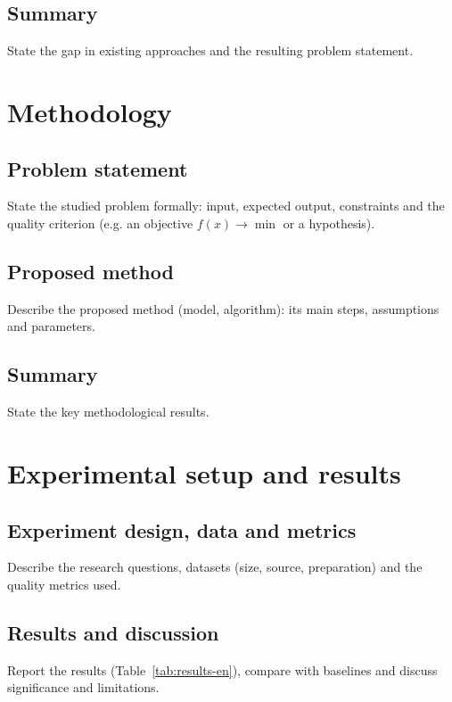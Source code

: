 \documentclass[12pt,a4paper]{extreport}
\begin{document}
\section{Summary}
State the gap in existing approaches and the resulting problem statement.

\clearpage
\chapter{Methodology}
\section{Problem statement}
State the studied problem formally: input, expected output, constraints and
the quality criterion (e.g. an objective $f(x)\to\min$ or a hypothesis).

\section{Proposed method}
Describe the proposed method (model, algorithm): its main steps, assumptions
and parameters.

\section{Summary}
State the key methodological results.

\clearpage
\chapter{Experimental setup and results}
\section{Experiment design, data and metrics}
Describe the research questions, datasets (size, source, preparation) and the
quality metrics used.

\section{Results and discussion}
Report the results (Table~\ref{tab:results-en}), compare with baselines and
discuss significance and limitations.
\end{document}
